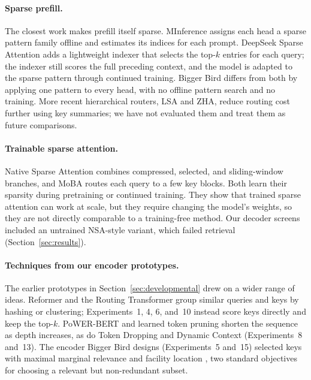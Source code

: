 \documentclass[11pt]{article}
\begin{document}
\paragraph{Sparse prefill.}
The closest work makes prefill itself sparse. MInference
\citep{jiang2024minference} assigns each head a sparse pattern family offline
and estimates its indices for each prompt. DeepSeek Sparse Attention
\citep{deepseek2025v32} adds a lightweight indexer that selects the top-$k$
entries for each query; the indexer still scores the full preceding context,
and the model is adapted to the sparse pattern through continued training.
Bigger Bird differs from both by applying one pattern to every head, with no
offline pattern search and no training. More recent hierarchical routers, LSA
and ZHA, reduce routing cost further using key summaries; we have not
evaluated them and treat them as future comparisons.

\paragraph{Trainable sparse attention.}
Native Sparse Attention \citep{yuan2025nsa} combines compressed, selected,
and sliding-window branches, and MoBA \citep{lu2025moba} routes each query to
a few key blocks. Both learn their sparsity during pretraining or continued
training. They show that trained sparse attention can work at scale, but they
require changing the model's weights, so they are not directly comparable to
a training-free method. Our decoder screens included an untrained NSA-style
variant, which failed retrieval (Section~\ref{sec:results}).

\paragraph{Techniques from our encoder prototypes.}
The earlier prototypes in Section~\ref{sec:developmental} drew on a wider
range of ideas. Reformer \citep{kitaev2020reformer} and the Routing
Transformer \citep{roy2021routing} group similar queries and keys by hashing
or clustering; Experiments~1, 4, 6, and~10 instead score keys directly and
keep the top-$k$. PoWER-BERT \citep{goyal2020powerbert} and learned token
pruning \citep{kim2021tokenpruning} shorten the sequence as depth increases,
as do Token Dropping and Dynamic Context (Experiments~8 and~13). The encoder
Bigger Bird designs (Experiments~5 and~15) selected keys with maximal
marginal relevance \citep{carbonell1998mmr} and facility location
\citep{lin2011submodular}, two standard objectives for choosing a relevant
but non-redundant subset.
\end{document}
